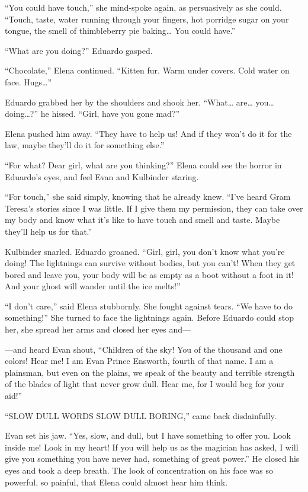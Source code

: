 \documentclass[10pt]{book}
\begin{document}
``You could have touch,'' she mind-spoke again, as persuasively as she could. ``Touch, taste, water running through your fingers, hot porridge sugar on your tongue, the smell of thimbleberry pie baking{\ldots} You could have.''

``What are you doing?'' Eduardo gasped.

``Chocolate,'' Elena continued. ``Kitten fur. Warm under covers. Cold water on face. Hugs{\ldots}''

Eduardo grabbed her by the shoulders and shook her. ``What{\ldots} are{\ldots} you{\ldots} doing{\ldots}?'' he hissed. ``Girl, have you gone mad?''

Elena pushed him away. ``They have to help us! And if they won't do it for the law, maybe they'll do it for something else.''

``For what? Dear girl, what are you thinking?'' Elena could see the horror in Eduardo's eyes, and feel Evan and Kulbinder staring.

``For touch,'' she said simply, knowing that he already knew. ``I've heard Gram Teresa's stories since I was little. If I give them my permission, they can take over my body and know what it's like to have touch and smell and taste. Maybe they'll help us for that.''

Kulbinder snarled. Eduardo groaned. ``Girl, girl, you don't know what you're doing! The lightnings can survive without bodies, but you can't! When they get bored and leave you, your body will be as empty as a boot without a foot in it! And your ghost will wander until the ice melts!''

``I don't care,'' said Elena stubbornly. She fought against tears. ``We have to do something!'' She turned to face the lightnings again. Before Eduardo could stop her, she spread her arms and closed her eyes and---

---and heard Evan shout, ``Children of the sky! You of the thousand and one colors! Hear me! I am Evan Prince Ensworth, fourth of that name. I am a plainsman, but even on the plains, we speak of the beauty and terrible strength of the blades of light that never grow dull. Hear me, for I would beg for your aid!''

``SLOW DULL WORDS SLOW DULL BORING,'' came back disdainfully.

Evan set his jaw. ``Yes, slow, and dull, but I have something to offer you. Look inside me! Look in my heart! If you will help us as the magician has asked, I will give you something you have never had, something of great power.'' He closed his eyes and took a deep breath. The look of concentration on his face was so powerful, so painful, that Elena could almost hear him think.
\end{document}
